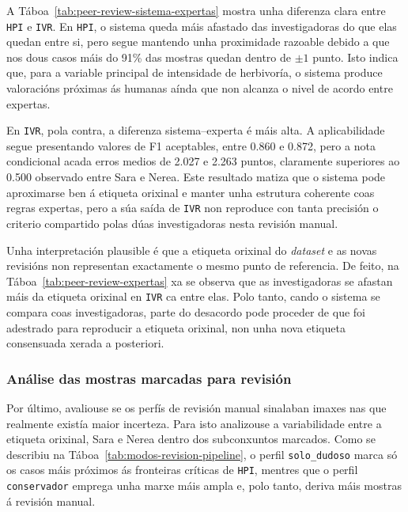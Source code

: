 A Táboa~\ref{tab:peer-review-sistema-expertas} mostra unha diferenza clara entre \texttt{HPI} e
\texttt{IVR}. En \texttt{HPI}, o sistema queda máis afastado das investigadoras do que elas quedan
entre si, pero segue mantendo unha proximidade razoable debido a que nos dous casos máis do 91\% das mostras
quedan dentro de $\pm 1$ punto. Isto indica que, para a variable principal de intensidade de
herbivoría, o sistema produce valoracións próximas ás humanas aínda que non alcanza o nivel de
acordo entre expertas.

En \texttt{IVR}, pola contra, a diferenza sistema--experta é máis alta. A aplicabilidade segue
presentando valores de F1 aceptables, entre 0.860 e 0.872, pero a nota condicional acada erros medios
de 2.027 e 2.263 puntos, claramente superiores ao 0.500 observado entre Sara e Nerea. Este resultado
matiza que o sistema pode aproximarse ben á etiqueta orixinal e manter unha
estrutura coherente coas regras expertas, pero a súa saída de \texttt{IVR} non reproduce con tanta
precisión o criterio compartido polas dúas investigadoras nesta revisión manual.

Unha interpretación plausible é que a etiqueta orixinal do \textit{dataset} e as novas revisións non
representan exactamente o mesmo punto de referencia. De feito, na Táboa~\ref{tab:peer-review-expertas}
xa se observa que as investigadoras se afastan máis da etiqueta orixinal en \texttt{IVR} ca entre
elas. Polo tanto, cando o sistema se compara coas investigadoras, parte do desacordo pode proceder
de que foi adestrado para reproducir a etiqueta orixinal, non unha nova etiqueta consensuada xerada
a posteriori.

\subsubsection{Análise das mostras marcadas para revisión}
Por último, avaliouse se os perfís de revisión manual sinalaban imaxes nas que realmente existía
maior incerteza. Para isto analizouse a variabilidade
entre a etiqueta orixinal, Sara e Nerea dentro dos subconxuntos marcados.
Como se describiu na Táboa~\ref{tab:modos-revision-pipeline}, o perfil \texttt{solo\_dudoso} marca só
os casos máis próximos ás fronteiras críticas de \texttt{HPI}, mentres que o perfil
\texttt{conservador} emprega unha marxe máis ampla e, polo tanto, deriva máis mostras á revisión
manual.

